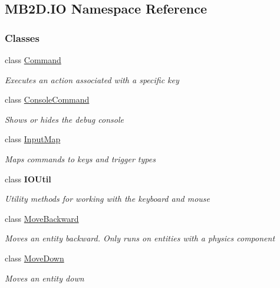 \hypertarget{namespace_m_b2_d_1_1_i_o}{}\subsection{M\+B2\+D.\+IO Namespace Reference}
\label{namespace_m_b2_d_1_1_i_o}
\subsubsection*{Classes}
\begin{DoxyCompactItemize}
\item 
class \hyperlink{class_m_b2_d_1_1_i_o_1_1_command}{Command}
\begin{DoxyCompactList}\small\item\em Executes an action associated with a specific key \end{DoxyCompactList}\item 
class \hyperlink{class_m_b2_d_1_1_i_o_1_1_console_command}{Console\+Command}
\begin{DoxyCompactList}\small\item\em Shows or hides the debug console \end{DoxyCompactList}\item 
class \hyperlink{class_m_b2_d_1_1_i_o_1_1_input_map}{Input\+Map}
\begin{DoxyCompactList}\small\item\em Maps commands to keys and trigger types \end{DoxyCompactList}\item 
class {\bfseries I\+O\+Util}
\begin{DoxyCompactList}\small\item\em Utility methods for working with the keyboard and mouse \end{DoxyCompactList}\item 
class \hyperlink{class_m_b2_d_1_1_i_o_1_1_move_backward}{Move\+Backward}
\begin{DoxyCompactList}\small\item\em Moves an entity backward. Only runs on entities with a physics component \end{DoxyCompactList}\item 
class \hyperlink{class_m_b2_d_1_1_i_o_1_1_move_down}{Move\+Down}
\begin{DoxyCompactList}\small\item\em Moves an entity down \end{DoxyCompactList}\item 

\end{DoxyCompactItemize}
